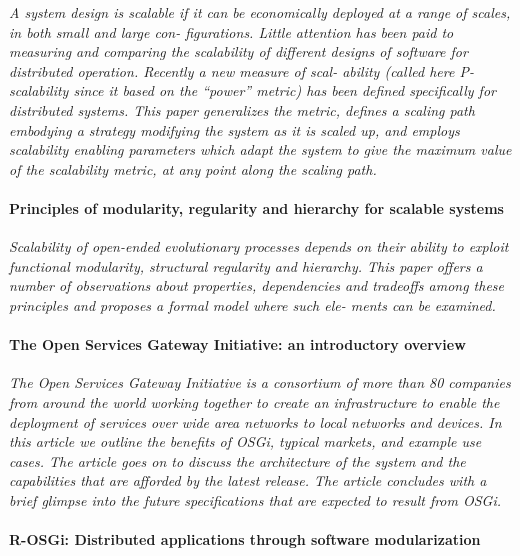 \documentclass{article}
\begin{document}
\emph{A system design is scalable if it can be economically deployed at a range
of scales, in both small and large con- figurations. Little attention has been
paid to measuring and comparing the scalability of different designs of
software for distributed operation. Recently a new measure of scal- ability
(called here P-scalability since it based on the “power” metric) has been
defined specifically for distributed systems. This paper generalizes the
metric, defines a scaling path embodying a strategy modifying the system as it
is scaled up, and employs scalability enabling parameters which adapt the
system to give the maximum value of the scalability metric, at any point along
the scaling path.}

\paragraph{Principles of modularity, regularity and hierarchy for scalable
systems} \cite{lipson2007principles}

\emph{Scalability of open-ended evolutionary processes depends on their ability
to exploit functional modularity, structural regularity and hierarchy.  This
paper offers a number of observations about properties, dependencies and
tradeoffs among these principles and proposes a formal model where such ele-
ments can be examined.}

\paragraph{The Open Services Gateway Initiative: an introductory overview} \cite{marples2001open}

\emph{The Open Services Gateway Initiative is a consortium of more than 80
companies from around the world working together to create an infrastructure to
enable the deployment of services over wide area networks to local networks and
devices. In this article we outline the benefits of OSGi, typical markets, and
example use cases. The article goes on to discuss the architecture of the
system and the capabilities that are afforded by the latest release. The
article concludes with a brief glimpse into the future specifications that are
expected to result from OSGi.}

\paragraph{R-OSGi: Distributed applications through software modularization}
\cite{rellermeyer2007r}
\end{document}
